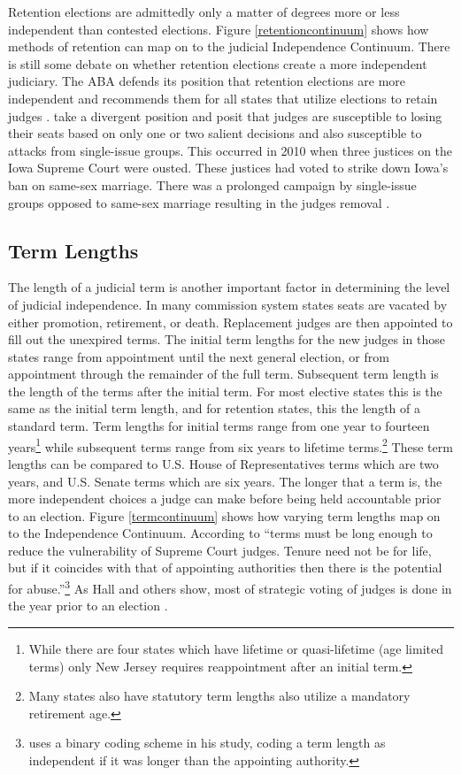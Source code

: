 \documentclass[12pt]{article}
\begin{document}
Retention elections are admittedly only a matter of degrees more or less independent than contested elections. Figure \ref{retentioncontinuum} shows how methods of retention can map on to the judicial Independence Continuum.  There is still some debate on whether retention elections create a more independent judiciary. The ABA defends its position that retention elections are more independent and recommends them for all states that utilize elections to retain judges \citep{ABA2003}.  \citep{Canes-Wrone2012} take a divergent position and posit that judges are susceptible to losing their seats based on only one or two salient decisions and also susceptible to attacks from single-issue groups.  This occurred in 2010 when three justices on the Iowa Supreme Court were ousted. These justices had voted to strike down Iowa’s ban on same-sex marriage. There was a prolonged campaign by single-issue groups opposed to same-sex marriage resulting in the judges removal \citep{Iowa2010}.

\subsection*{Term Lengths}
The length of a judicial term is another important factor in determining the level of judicial independence.  In many commission system states seats are vacated by either promotion, retirement, or death. Replacement judges are then appointed to fill out the unexpired terms. The initial term lengths for the new judges in those states range from appointment until the next general election, or from appointment through the remainder of the full term. Subsequent term length is the length of the terms after the initial term. For most elective states this is the same as the initial term length, and for retention states, this the length of a standard term. Term lengths for initial terms range from one year to fourteen years\footnote{While there are four states which have lifetime or quasi-lifetime (age limited terms) only New Jersey requires reappointment after an initial term.} while subsequent terms range from six years to lifetime terms.\footnote{Many states also have statutory term lengths also utilize a mandatory retirement age.}  These term lengths can be compared to U.S. House of Representatives terms which are two years, and U.S. Senate terms which are six years.  The longer that a term is, the more independent choices a judge can make before being held accountable prior to an election.  Figure \ref{termcontinuum} shows how varying term lengths map on to the Independence Continuum.  According to \citet[31]{Rios2006} ``terms must be long enough to reduce the vulnerability of Supreme Court judges.  Tenure need not be for life, but if it coincides with that of appointing authorities then there is the potential for abuse.''\footnote{\citet{Rios2006} uses a binary coding scheme in his study, coding a term length as independent if it was longer than the appointing authority.}  As Hall and others show, most of strategic voting of judges is done in the year prior to an election \citep{Hall1987,Hall1985,Brace2008,Canes-Wrone2012}.  
\end{document}
